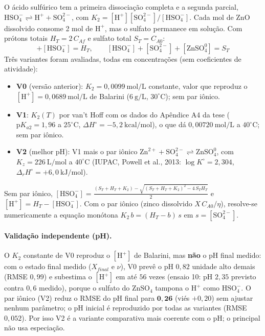 \documentclass[12pt,a4paper]{article}
\begin{document}
O ácido sulfúrico tem a primeira dissociação completa e a segunda parcial, $\text{HSO}_4^- \rightleftharpoons \text{H}^+ + \text{SO}_4^{2-}$, com $K_2 = [\text{H}^+][\text{SO}_4^{2-}]/[\text{HSO}_4^-]$. Cada mol de ZnO dissolvido consome 2 mol de $\text{H}^+$, mas o sulfato permanece em solução. Com prótons totais $H_T = 2\,C_{Af}$ e sulfato total $S_T = C_{A0}$:
\begin{equation}
    [\text{H}^+] + [\text{HSO}_4^-] = H_T, \qquad [\text{HSO}_4^-] + [\text{SO}_4^{2-}] + [\text{ZnSO}_4^0] = S_T
\end{equation}
Três variantes foram avaliadas, todas em concentrações (sem coeficientes de atividade):
\begin{itemize}
    \item \textbf{V0} (versão anterior): $K_2 = 0{,}0099\ \text{mol/L}$ constante, valor que reproduz o $[\text{H}^+] = 0{,}0689\ \text{mol/L}$ de Balarini ($6\ \text{g/L}$, $30^\circ\text{C}$); sem par iônico.
    \item \textbf{V1}: $K_2(T)$ por van't Hoff com os dados do Apêndice A4 da tese ($\text{p}K_{a2} = 1{,}96$ a $25^\circ\text{C}$, $\Delta H^\circ = -5{,}2\ \text{kcal/mol}$), o que dá $0{,}00720\ \text{mol/L}$ a $40^\circ\text{C}$; sem par iônico.
    \item \textbf{V2} (melhor pH): V1 mais o par iônico $\text{Zn}^{2+} + \text{SO}_4^{2-} \rightleftharpoons \text{ZnSO}_4^0$, com $K_z = 226\ \text{L/mol}$ a $40^\circ\text{C}$ (IUPAC, Powell et al., 2013: $\log K^\circ = 2{,}304$, $\Delta_r H^\circ = +6{,}0\ \text{kJ/mol}$).
\end{itemize}
Sem par iônico, $[\text{HSO}_4^-] = \frac{(S_T + H_T + K_2) - \sqrt{(S_T + H_T + K_2)^2 - 4\,S_T H_T}}{2}$ e $[\text{H}^+] = H_T - [\text{HSO}_4^-]$. Com o par iônico (zinco dissolvido $X\,C_{A0}/\eta$), resolve-se numericamente a equação monótona $K_2\,b = (H_T - b)\,s$ em $s = [\text{SO}_4^{2-}]$.

\paragraph{Validação independente (pH).} O $K_2$ constante de V0 reproduz o $[\text{H}^+]$ de Balarini, mas \textbf{não} o pH final medido: com o estado final medido ($X_{final}$ e $\nu$), V0 prevê o pH $0{,}82$ unidade alto demais (RMSE $0{,}99$) e subestima o $[\text{H}^+]$ em até $56$ vezes (ensaio 10: pH $2{,}35$ previsto contra $0{,}6$ medido), porque o sulfato do $\text{ZnSO}_4$ tampona o $\text{H}^+$ como $\text{HSO}_4^-$. O par iônico (V2) reduz o RMSE do pH final para $\mathbf{0{,}26}$ (viés $+0{,}20$) sem ajustar nenhum parâmetro; o pH inicial é reproduzido por todas as variantes (RMSE $0{,}052$). Por isso V2 é a variante comparativa mais coerente com o pH; o principal não usa especiação.
\end{document}

